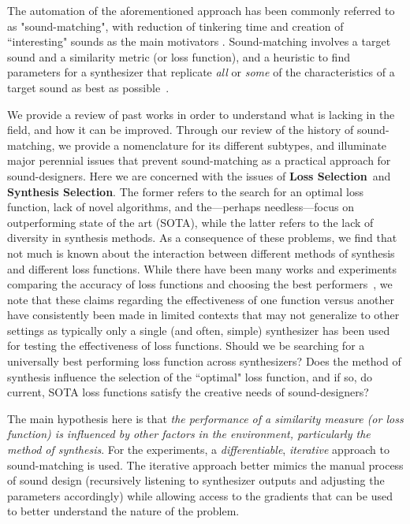 \documentclass[lettersize,journal]{IEEEtran}
\providecommand{\gls}[1]{#1}
\newcommand{\LossSelect}{\textbf{Loss Selection}}
\newcommand{\SynthSelect}{\textbf{Synthesis Selection}}
\begin{document}
The automation of the aforementioned approach has been commonly referred to as "sound-matching", with reduction of tinkering time and creation of ``interesting" sounds as the main motivators \cite{krekovic2019insights,turian2020sorry,horner1993machine,salimi2020make,esling2019flow,engel2020ddsp,mitchell2007evolutionary,shier2020spiegelib,masuda2021soundmatch,masuda2023improving}. Sound-matching involves a target sound and a similarity metric (or loss function), and a heuristic to find parameters for a synthesizer that replicate \textit{all} or \textit{some} of the characteristics of a target sound as best as possible~\cite{horner1993machine,mitchell2007evolutionary,masuda2023improving}. 

We provide a review of past works in order to understand what is lacking in the field, and how it can be improved. Through our review of the history of sound-matching, we provide a nomenclature for its different subtypes, and illuminate major perennial issues that prevent sound-matching as a practical approach for sound-designers. Here we are concerned with the issues of \LossSelect~and \SynthSelect. The former refers to the search for an optimal loss function, lack of novel algorithms, and the---perhaps needless---focus on outperforming state of the art (\gls{SOTA}), while the latter refers to the lack of diversity in synthesis methods. As a consequence of these problems, we find that not much is known about the interaction between different methods of synthesis and different loss functions. While there have been many works and experiments comparing the accuracy of loss functions and choosing the best performers~\cite{vahidi2023mesostructures,turian2020sorry,engel2020ddsp,uzrad2024diffmoog,han2023perceptual,masuda2021soundmatch,turian2020sorry,bruford2024synthesizer}, we note that these claims regarding the effectiveness of one function versus another have consistently been made in limited contexts that may not generalize to other settings as typically only a single (and often, simple) synthesizer has been used for testing the effectiveness of loss functions. Should we be searching for a universally best performing loss function across synthesizers? Does the method of synthesis influence the selection of the ``optimal" loss function, and if so, do current, SOTA loss functions satisfy the creative needs of sound-designers? 

The main hypothesis here is that \textit{the performance of a similarity measure (or loss function) is influenced by other factors in the environment, particularly the method of synthesis}. For the experiments, a \textit{differentiable}, \textit{iterative} approach to sound-matching is used. The iterative approach  better mimics the manual process of sound design (recursively listening to synthesizer outputs and adjusting the parameters accordingly) while allowing access to the gradients that can be used to better understand the nature of the problem. 
\end{document}
